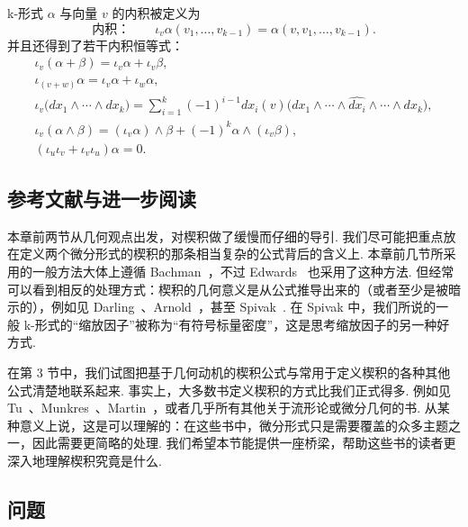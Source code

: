 k-形式 $\alpha$ 与向量 $v$ 的内积被定义为
\[
\text{内积：}\qquad\iota_v\alpha(v_1,\ldots,v_{k-1})=\alpha(v,v_1,\ldots,v_{k-1}).
\]
并且还得到了若干内积恒等式：
\begin{align*}
\iota_v(\alpha+\beta)=\iota_v\alpha+\iota_v\beta, \\
\iota_{(v+w)}\alpha=\iota_v\alpha+\iota_w\alpha, \\
\iota_v\bigl(dx_1\wedge\cdots\wedge dx_k\bigr)
=\sum_{i=1}^{k}(-1)^{i-1}dx_i(v)\bigl(dx_1\wedge\cdots\wedge\widehat{dx_i}\wedge\cdots\wedge dx_k\bigr), \\
\iota_v(\alpha\wedge\beta)=(\iota_v\alpha)\wedge\beta+(-1)^k\alpha\wedge(\iota_v\beta), \\
(\iota_u\iota_v+\iota_v\iota_u)\alpha=0.
\end{align*}

\subsection{参考文献与进一步阅读}

本章前两节从几何观点出发，对楔积做了缓慢而仔细的导引. 我们尽可能把重点放在定义两个微分形式的楔积的那条相当复杂的公式背后的含义上. 本章前几节所采用的一般方法大体上遵循 Bachman~\cite{ref04}，不过 Edwards~\cite{ref18} 也采用了这种方法. 但经常可以看到相反的处理方式：楔积的几何意义是从公式推导出来的（或者至少是被暗示的），例如见 Darling~\cite{ref12}、Arnold~\cite{ref03}，甚至 Spivak~\cite{ref41}. 在 Spivak 中，我们所说的一般 k-形式的``缩放因子''被称为``有符号标量密度''，这是思考缩放因子的另一种好方式.

在第 3 节中，我们试图把基于几何动机的楔积公式与常用于定义楔积的各种其他公式清楚地联系起来. 事实上，大多数书定义楔积的方式比我们正式得多. 例如见 Tu~\cite{ref46}、Munkres~\cite{ref35}、Martin~\cite{ref33}，或者几乎所有其他关于流形论或微分几何的书. 从某种意义上说，这是可以理解的：在这些书中，微分形式只是需要覆盖的众多主题之一，因此需要更简略的处理. 我们希望本节能提供一座桥梁，帮助这些书的读者更深入地理解楔积究竟是什么.

\subsection{问题}

